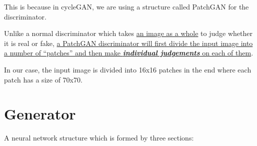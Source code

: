 \documentclass[
]{article}
\begin{document}
This is because in cycleGAN, we are using a structure called PatchGAN
for the discriminator.

Unlike a normal discriminator which takes \uline{an image as a whole} to
judge whether it is real or fake, \uline{a PatchGAN discriminator will
first divide the input image into a number of ``patches'' and then make
\emph{\textbf{individual judgements}} on each of them}.

In our case, the input image is divided into 16x16 patches in the end
where each patch has a size of 70x70.

\hypertarget{generator}{%
\section{Generator}\label{generator}}

A neural network structure which is formed by three sections:
\end{document}
